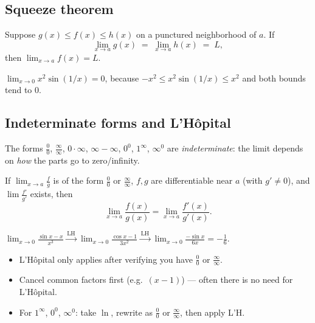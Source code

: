 \subsection{Squeeze theorem}
\begin{theorem}[Squeeze]
Suppose $g(x) \le f(x) \le h(x)$ on a punctured neighborhood of $a$. If
\[ \lim_{x\to a} g(x) \;=\; \lim_{x\to a} h(x) \;=\; L, \]
then $\lim_{x\to a} f(x) = L$.
\end{theorem}

\begin{example}
$\displaystyle \lim_{x\to 0} x^2 \sin(1/x) = 0$, because $-x^2 \le x^2 \sin(1/x) \le x^2$
and both bounds tend to $0$.
\end{example}

\subsection{Indeterminate forms and L'H\^opital}
The forms $\tfrac{0}{0}$, $\tfrac{\infty}{\infty}$, $0 \cdot \infty$, $\infty - \infty$,
$0^0$, $1^\infty$, $\infty^0$ are \emph{indeterminate}: the limit depends on \emph{how} the parts go to zero/infinity.

\begin{theorem}
If $\lim_{x\to a} \tfrac{f}{g}$ is of the form $\tfrac{0}{0}$ or $\tfrac{\infty}{\infty}$,
$f, g$ are differentiable near $a$ (with $g'\neq 0$), and $\lim \tfrac{f'}{g'}$ exists, then
\[ \lim_{x\to a} \frac{f(x)}{g(x)} = \lim_{x\to a} \frac{f'(x)}{g'(x)}. \]
\end{theorem}

\begin{example}
$\displaystyle \lim_{x\to 0} \frac{\sin x - x}{x^3} \xrightarrow{\,\text{LH}\,} \lim_{x\to 0} \frac{\cos x - 1}{3x^2}
\xrightarrow{\,\text{LH}\,} \lim_{x\to 0} \frac{-\sin x}{6x} = -\tfrac{1}{6}.$
\end{example}

\begin{pitfallbox}
\begin{itemize}[leftmargin=*,nosep]
  \item L'H\^opital only applies after verifying you have $\tfrac{0}{0}$ or $\tfrac{\infty}{\infty}$.
  \item Cancel common factors first (e.g.\ $(x-1)$) --- often there is no need for L'H\^opital.
  \item For $1^\infty$, $0^0$, $\infty^0$: take $\ln$, rewrite as $\tfrac{0}{0}$ or $\tfrac{\infty}{\infty}$, then apply L'H.
\end{itemize}
\end{pitfallbox}
